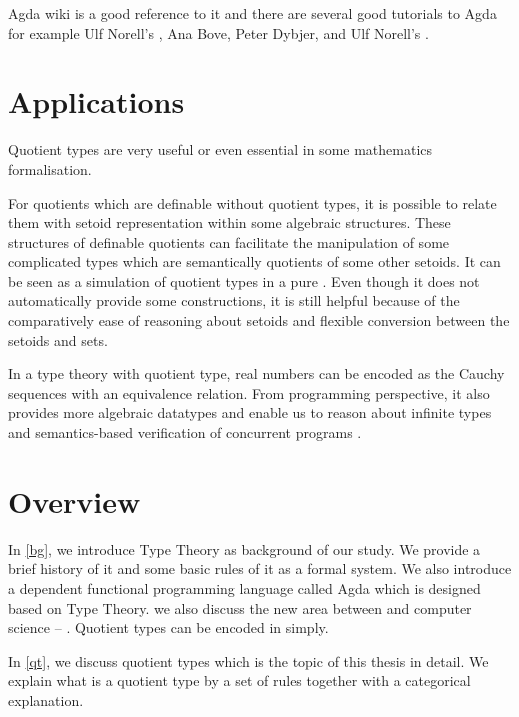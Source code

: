 Agda wiki\cite{agdawiki:main} is a good reference to it and there are
several good tutorials to Agda for example Ulf Norell's
\cite{tutorial}, Ana Bove, Peter Dybjer, and Ulf Norell's \cite{bove2009brief}.



\section{Applications}


Quotient types are very useful or even essential in some
mathematics formalisation. 

For quotients which are definable without quotient types, it is
possible to relate them with setoid representation within some
algebraic structures. 
These structures of definable quotients can facilitate the
manipulation of some complicated types which
are semantically quotients of some other setoids. It can be seen as a
simulation of quotient types in a pure \itt. Even though it does not
automatically provide some constructions, it is still helpful because
of the comparatively ease of reasoning about setoids and flexible
conversion between the setoids and sets.


In a type theory with quotient type, real numbers can be encoded as
the Cauchy sequences with an equivalence relation.
From programming perspective,  it also provides more algebraic
datatypes and enable us to reason about infinite types and
semantics-based verification of concurrent programs \cite{hof:phd}.


\section{Overview}





In \autoref{bg}, we introduce Type Theory as background of our study. We provide a brief
history of it and some basic rules of it as a formal system.
We also introduce a dependent functional
programming language called Agda which is designed based on Type Theory.
we also discuss the new area between \maths and
computer science -- \hott. Quotient types can be encoded in \hott simply.


In \autoref{qt}, we discuss quotient types which is the topic of
this thesis in detail. We explain what is a quotient type by a set of rules  together with a categorical explanation.



